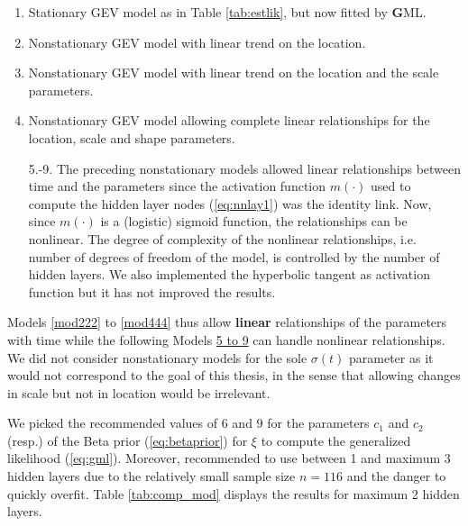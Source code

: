 \begin{enumerate}
	\item\label{mod111} Stationary GEV model as in Table \ref{tab:estlik}, but now fitted by \textbf{G}ML.
	
	\item\label{mod222} Nonstationary GEV  model with linear trend on the location. 
	\item Nonstationary GEV model with linear trend on the location and the scale parameters.
	
	\item\label{mod444} Nonstationary GEV model allowing complete linear relationships for the location, scale and shape parameters.
	
	\item[5.-9.]\label{i:nonlin} The preceding nonstationary models allowed linear relationships between time and the parameters since the activation function $m(\cdot)$ used to compute the hidden layer nodes (\ref{eq:nnlay1}) was the identity link. Now, since $m(\cdot)$ is a (logistic) sigmoid function, the relationships can be nonlinear. The degree of complexity of the nonlinear relationships, i.e. number of degrees of freedom of the model, is controlled by the number of hidden layers. We also implemented the hyperbolic tangent as activation function but it has not improved the results.
\end{enumerate}
Models \ref{mod222} to \ref{mod444} thus allow \textbf{linear} relationships of the parameters with time while the following Models \hyperref[i:nonlin]{5 to 9} can handle nonlinear relationships.
We did not consider nonstationary models for the sole $\sigma(t)$ parameter as it would not correspond to the goal of this thesis, in the sense that allowing changes in scale but not in location would be irrelevant. 

We picked the recommended values of $6$ and $9$ for the parameters $c_1$ and $c_2$ (resp.) of the Beta prior (\ref{eq:betaprior}) for $\xi$ to compute the generalized likelihood (\ref{eq:gml}). Moreover, 
\citet{cannon_flexible_2010} recommended to use between 1 and maximum 3 hidden layers due to the relatively small sample size $n=116$ and the danger to quickly overfit. Table \ref{tab:comp_mod} displays the results for maximum 2 hidden layers.



